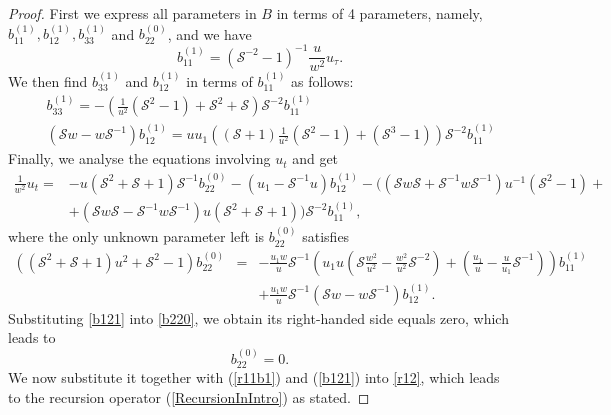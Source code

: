 \documentclass{article}
\numberwithin{equation}{section}
\newcommand\cS{{\mathcal S}}
\begin{document}
\begin{proof}
First we express all parameters in $B$ in terms of 4 parameters, namely, 
$b^{(1)}_{11},  b^{(1)}_{12},  b^{(1)}_{33}$ and $b^{(0)}_{22} $, and we have
\begin{equation}
 b^{(1)}_{11}= (\mathcal{S}^{-2}-1)^{-1}\frac{u}{w^2}u_\tau. \label{r11b1}
\end{equation}
We then find 
$b^{(1)}_{33}$ and $b^{(1)}_{12}$ in terms of $b^{(1)}_{11}$ as follows:
		\begin{eqnarray}
&& b^{(1)}_{    33} =-\left(\frac{1}{u^2} 
(\mathcal{S}^2-1)+\mathcal{S}^2+\mathcal{S}\right) \mathcal{S}^{-2} b^{(1)}_{11}\label{r11bis}\\
&&\left(\mathcal{S} w- w \mathcal{S}^{-1} \right) 
b^{(1)}_{    1 2}= u u_1 \left( \left(\mathcal{S}+1\right) 
\frac{1}{u^2}\left(\mathcal{S}^2-1\right)+\left(\mathcal{S}^3-1\right)\right) 
\mathcal{S}^{-2} b^{(1)}_{11}\label{b121}
		\end{eqnarray}
Finally, we analyse the equations involving $u_t$ and get 
		\begin{equation}
			\begin{split}
				\frac{1}{w^2} u_t= & -u\left(\mathcal{S} 
^2+\mathcal{S} +1\right) \mathcal{\mathcal{S} }^{-1} b^{(0)}_{    22} -\left( 
{u_1}- \mathcal{S}^{-1} u\right) b^{(1)}_{    12}  -\Big(\left(\cS w \cS + \cS^{-1} w \cS^{-1}\right)u^{-1} \left(\cS^2 -1\right)+\\ & + \left(\cS w \cS - \cS^{-1} w \cS^{-1}\right) u \left(\cS^2 + \cS + 1 \right)\Big) 
\mathcal{\mathcal{S} }^{-2} b^{(1)}_{11},
			\end{split}
			\label{r12}
		\end{equation}
where the only unknown parameter left is $b^{(0)}_{22}$ satisfies
		\begin{eqnarray}
				 \left(\left(\mathcal{S}^2+\mathcal{S}+1\right) 
u^2+\mathcal{S}^2-1\right) b^{(0)}_{22} &=& -\frac{ {u_1} w}{u} \cS^{-1} \left(u_1  
{u} \left(\cS \frac{ {w}^2}{ {u}^2}-\frac{ {w}^2}{  
{u}^2}\mathcal{S}^{-2}\right)  + 
\left(\frac{u_1}{u}-\frac{u}{u_1}\mathcal{S}^{-1}\right) \right) b^{(1)}_{11} \nonumber\\ && 
 + \frac{{u_1} w}{u}\cS^{-1} \left(\mathcal{S} w - w
\mathcal{S}^{-1} \right) b^{(1)}_{12}. \label{b220}
		\end{eqnarray}
Substituting \eqref{b121} into \eqref{b220}, we obtain its right-handed side equals zero,
which leads to 
\begin{equation*}
b^{(0)}_{22} = 0 .
		\end{equation*}
We now substitute it together with (\ref{r11b1}) and (\ref{b121}) into \eqref{r12}, which leads to
the recursion operator (\ref{RecursionInIntro}) as stated.
\end{proof}
\end{document}
